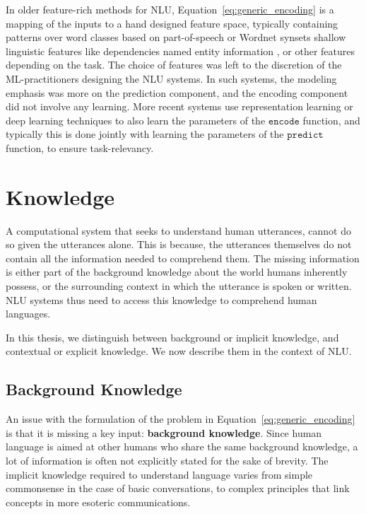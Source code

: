 In older feature-rich methods for NLU, 
Equation~\ref{eq:generic_encoding} is a mapping of the inputs to a hand designed feature space, typically containing patterns over word classes based on
part-of-speech \citep{corley2005measuring} or Wordnet synsets \citep{moldovan2001logic} shallow linguistic features like dependencies \citep{bos2005recognising}
named entity information \cite{tatu2005semantic}, or other features depending on the task. The choice of features was left to the discretion of the ML-practitioners
designing the NLU systems. In such systems, the modeling emphasis was more on the prediction component, and the encoding component did not involve any learning. 
More recent systems \citep[among many others]{bahdanau:14,weston2014memory,hermann2015teaching,Xiong2016DynamicMN,bowman2016fast,yang:16} 
use representation learning or deep learning techniques to also learn the parameters of the
$\mathtt{encode}$ function, and typically this is done jointly with learning the parameters of the $\mathtt{predict}$ function, to ensure task-relevancy.

\section{Knowledge}
\label{sec:intro_external_knowledge}
A computational system that seeks to understand human utterances, cannot do so given the utterances alone. This is because, the utterances themselves
do not contain all the information needed to comprehend them. The missing information is either part of the background knowledge about the world humans
inherently possess, or the surrounding context in which the utterance is spoken or written. NLU systems thus need to access this knowledge to comprehend
human languages.

In this thesis, we distinguish between background or implicit knowledge, and contextual or explicit knowledge. We now describe them in the context of NLU.

\subsection{Background Knowledge}
An issue with the formulation of the problem in Equation~\ref{eq:generic_encoding} is that it is missing a key input: \textbf{background knowledge}. 
Since human language is aimed at other humans who share 
the same background knowledge, a lot of information is often not explicitly stated
for the sake of brevity. The implicit knowledge required to understand language varies 
from simple commonsense in the case of basic conversations, to complex principles that link 
concepts in more esoteric communications.

